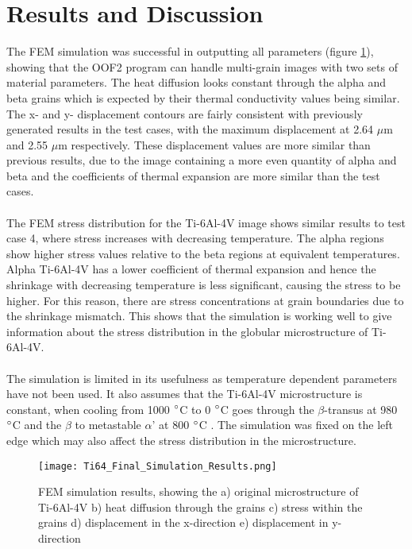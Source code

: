 \documentclass[report.tex]{subfiles}
\begin{document}
\section{Results and Discussion}

\noindent The FEM simulation was successful in outputting all parameters (figure \ref{fig:FinalSimulationResults}), showing that the OOF2 program can handle multi-grain images with two sets of material parameters. The heat diffusion looks constant through the alpha and beta grains which is expected by their thermal conductivity values being similar. The x- and y- displacement contours are fairly consistent with previously generated results in the test cases, with the maximum displacement at 2.64 $\mu$m and 2.55 $\mu$m respectively. These displacement values are more similar than previous results, due to the image containing a more even quantity of alpha and beta and the coefficients of thermal expansion are more similar than the test cases.\\
\\
\noindent The FEM stress distribution for the Ti-6Al-4V image shows similar results to test case 4, where stress increases with decreasing temperature. The alpha regions show higher stress values relative to the beta regions at equivalent temperatures. Alpha Ti-6Al-4V has a lower coefficient of thermal expansion and hence the shrinkage with decreasing temperature is less significant, causing the stress to be higher. For this reason, there are stress concentrations at grain boundaries due to the shrinkage mismatch. This shows that the simulation is working well to give information about the stress distribution in the globular microstructure of Ti-6Al-4V.\\
\\
\noindent The simulation is limited in its usefulness as temperature dependent parameters have not been used. It also assumes that the Ti-6Al-4V microstructure is constant, when cooling from 1000 $\degree$C to 0 $\degree$C goes through the $\beta$-transus at 980 $\degree$C and the $\beta$ to metastable $\alpha$' at 800 $\degree$C \cite{Ti64PhaseDiagram}. The simulation was fixed on the left edge which may also affect the stress distribution in the microstructure.

\begin{figure}[H]
    \centering
    \texttt{[image: Ti64\_Final\_Simulation\_Results.png]}
    \caption{FEM simulation results, showing the a) original microstructure of Ti-6Al-4V b) heat diffusion through the grains c) stress    within the grains d) displacement in the x-direction e) displacement in y-direction}
    \label{fig:FinalSimulationResults}
\end{figure}
\pagebreak
\end{document}
